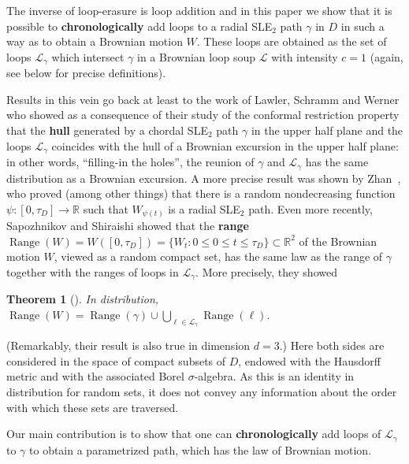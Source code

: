 \documentclass[11pt]{article}
\newtheorem*{theorem*}{Theorem}
\def\R{{\mathbb R}}
\def\cL{{\mathcal L}}
\DeclareMathOperator{\Range}{Range}
\begin{document}
The inverse of loop-erasure is loop addition and in this paper we show that it is possible to \textbf{chronologically} add loops to a radial SLE$_2$ path $\gamma$ in $D$ in such a way as to obtain a Brownian motion $W$. These loops are obtained as the set of loops $\cL_\gamma$ which intersect $\gamma$ in a Brownian loop soup $\cL$ with intensity $c = 1$ (again, see below for precise definitions).

Results in this vein go back at least to the work of Lawler, Schramm and Werner \cite{LSWrestriction} who showed as a consequence of their study of the conformal restriction property that the \textbf{hull} generated by a chordal SLE$_2$ path $\gamma$ in the upper half plane and the loops $\cL_\gamma$ coincides with the hull of a Brownian excursion in the upper half plane: in other words, ``filling-in the holes'', the reunion of $\gamma$ and $\cL_\gamma$ has the same distribution as a Brownian excursion.  A more precise result was shown by Zhan~\cite{Zhan}, who proved (among other things) that there is a random nondecreasing function $\psi: [ 0, \tau_D] \to \R$ such that $W_{\psi(t)}$ is a radial SLE$_2$ path. Even more recently,
Sapozhnikov and Shiraishi \cite{SapozhnikovShiraishi} showed that the \textbf{range} $\Range (W) = W ([0, \tau_D]) = \{ W_t: 0\le 0 \le t \le \tau_D\} \subset \R^2$ of the Brownian motion $W$, viewed as a random compact set, has the same law as the range of $\gamma$ together with the ranges of loops in  $\cL_\gamma$. More precisely, they showed

\begin{theorem*}[{\cite[Theorem 1.1]{SapozhnikovShiraishi}}]
	In distribution,
	$
	\Range( W)=\Range(\gamma)\cup \bigcup_{\ell \in \mathcal{L}_\gamma } \Range(\ell).
	$
\end{theorem*}
(Remarkably, their result is also true in dimension $d = 3$.) Here both sides are considered in the space of compact subsets of $D$, endowed with the Hausdorff metric and with the associated Borel $\sigma$-algebra. As this is an identity in distribution for random sets, it does not convey any information about the order with which these sets are traversed.


Our main contribution is to show that one can \textbf{chronologically} add loops of $\cL_\gamma$ to $\gamma$ to obtain a parametrized path, which has the law of Brownian motion.
\end{document}
